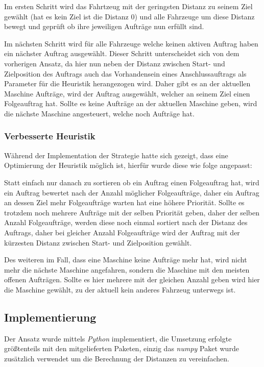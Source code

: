 \documentclass[ngerman]{tudscrreprt}
\begin{document}
Im ersten Schritt wird das Fahrtzeug mit der geringsten Distanz zu seinem Ziel gewählt (hat es kein Ziel ist die Distanz \num{0}) und alle Fahrzeuge um diese Distanz bewegt und
geprüft ob ihre jeweiligen Aufträge nun erfüllt sind.

Im nächsten Schritt wird für alle Fahrzeuge welche keinen aktiven Auftrag haben ein nächster
Auftrag ausgewählt. Dieser Schritt unterscheidet sich von dem vorherigen Ansatz,
da hier nun neben der Distanz zwischen Start- und Zielposition des Auftrags auch
das Vorhandensein eines Anschlussauftrags als Parameter für die Heuristik herangezogen wird.
Daher gibt es an der aktuellen Maschine Aufträge, wird der Auftrag ausgewählt, welcher
an seinem Ziel einen Folgeauftrag hat.
Sollte es keine Aufträge an der aktuellen Maschine geben, wird die nächste Maschine angesteuert,
welche noch Aufträge hat.

\subsubsection{Verbesserte Heuristik}
Während der Implementation der Strategie hatte sich gezeigt, dass eine Optimierung der
Heuristik möglich ist, hierfür wurde diese wie folge angepasst:

Statt einfach nur danach zu sortieren ob ein Auftrag einen Folgeauftrag hat,
wird ein Auftrag bewertet nach der Anzahl möglicher Folgeaufträge, daher ein Auftrag
an dessen Ziel mehr Folgeaufträge warten hat eine höhere Priorität.
Sollte es trotzdem noch mehrere Aufträge mit der selben Priorität geben, daher der selben Anzahl
Folgeaufträge, werden diese noch einmal sortiert nach der Distanz des Auftrags,
daher bei gleicher Anzahl Folgeaufträge wird der Auftrag mit der kürzesten Distanz zwischen
Start- und Zielposition gewählt.

Des weiteren im Fall, dass eine Maschine keine Aufträge mehr hat, wird nicht mehr die nächste
Maschine angefahren, sondern die Maschine mit den meisten offenen Aufträgen. Sollte es hier mehrere mit der gleichen Anzahl geben wird hier die Maschine gewählt, zu der aktuell kein
anderes Fahrzeug unterwegs ist.


\subsection{Implementierung}
Der Ansatz wurde mittels \emph{Python} implementiert, die Umsetzung erfolgte größtenteils
mit den mitgelieferten Paketen, einzig das \emph{numpy} Paket wurde zusätzlich verwendet
um die Berechnung der Distanzen zu vereinfachen.
\end{document}
